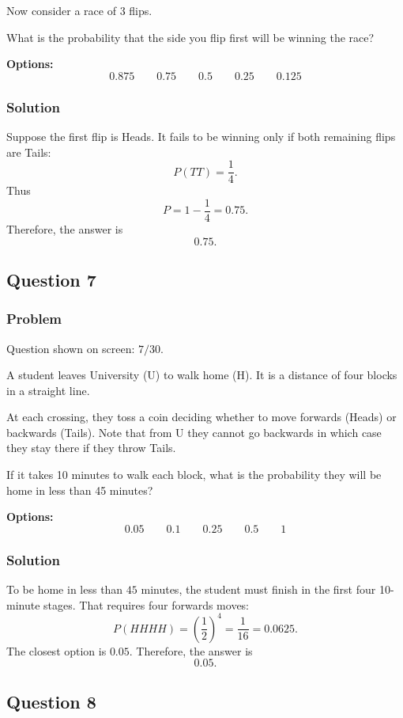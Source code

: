 \documentclass[12pt]{article}
\begin{document}
Now consider a race of 3 flips.

What is the probability that the side you flip first will be winning the race?

\noindent\textbf{Options:}
\[
\boxed{0.875}
\qquad
\boxed{0.75}
\qquad
\boxed{0.5}
\qquad
\boxed{0.25}
\qquad
\boxed{0.125}
\]

\subsubsection{Solution}
Suppose the first flip is Heads. It fails to be winning only if both remaining flips are Tails:
\[
P(TT)=\frac{1}{4}.
\]
Thus
\[
P=1-\frac{1}{4}=0.75.
\]
Therefore, the answer is
\[
\boxed{0.75}.
\]

\subsection{Question 7}
\subsubsection{Problem}
Question shown on screen: \(7/30\).

A student leaves University (U) to walk home (H). It is a distance of four blocks in a straight line.

At each crossing, they toss a coin deciding whether to move forwards (Heads) or backwards (Tails). Note that from U they cannot go backwards in which case they stay there if they throw Tails.

If it takes 10 minutes to walk each block, what is the probability they will be home in less than 45 minutes?

\noindent\textbf{Options:}
\[
\boxed{0.05}
\qquad
\boxed{0.1}
\qquad
\boxed{0.25}
\qquad
\boxed{0.5}
\qquad
\boxed{1}
\]

\subsubsection{Solution}
To be home in less than \(45\) minutes, the student must finish in the first four 10-minute stages. That requires four forwards moves:
\[
P(HHHH)=\left(\frac{1}{2}\right)^4=\frac{1}{16}=0.0625.
\]
The closest option is \(0.05\). Therefore, the answer is
\[
\boxed{0.05}.
\]

\subsection{Question 8}
\end{document}

